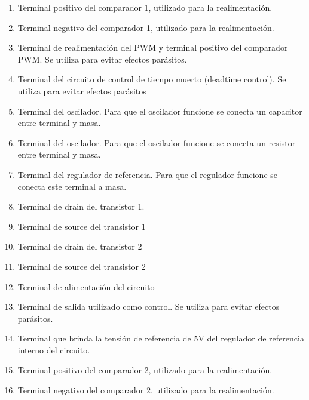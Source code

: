 \begin{enumerate}
\item Terminal positivo del comparador 1, utilizado para la realimentación.
\item Terminal negativo del comparador 1, utilizado para la realimentación.
\item Terminal de realimentación del PWM y terminal positivo del comparador PWM. Se utiliza para evitar efectos parásitos.
\item Terminal del circuito de control de tiempo muerto (deadtime control). Se utiliza para evitar efectos parásitos
\item Terminal del oscilador. Para que el oscilador funcione se conecta un capacitor entre terminal y masa.
\item Terminal del oscilador. Para que el oscilador funcione se conecta un resistor entre terminal y masa.
\item Terminal del regulador de referencia. Para que el regulador funcione se conecta este terminal a masa.
\item Terminal de drain del transistor 1. 
\item Terminal de source del transistor 1
\item Terminal de drain del transistor 2
\item Terminal de source del transistor 2
\item Terminal de alimentación del circuito
\item Terminal de salida utilizado como control. Se utiliza para evitar efectos parásitos.
\item  Terminal que brinda la tensión de referencia de 5V del regulador de referencia interno del circuito.
\item Terminal positivo del comparador 2, utilizado para la realimentación.
\item Terminal negativo del comparador 2, utilizado para la realimentación.
\end{enumerate}
